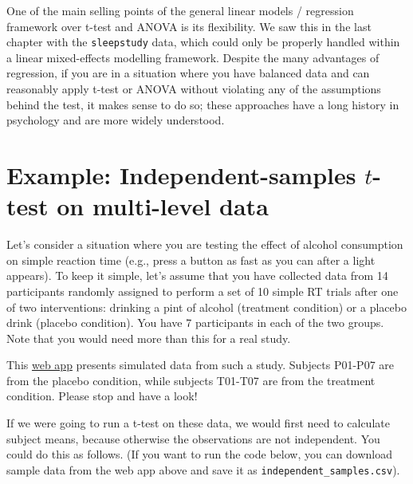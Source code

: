 \documentclass[]{book}
\newenvironment{Shaded}{\begin{snugshade}}{\end{snugshade}}
\newcommand{\DataTypeTok}[1]{\textcolor[rgb]{0.13,0.29,0.53}{#1}}
\newcommand{\KeywordTok}[1]{\textcolor[rgb]{0.13,0.29,0.53}{\textbf{#1}}}
\newcommand{\NormalTok}[1]{#1}
\newcommand{\OperatorTok}[1]{\textcolor[rgb]{0.81,0.36,0.00}{\textbf{#1}}}
\newcommand{\StringTok}[1]{\textcolor[rgb]{0.31,0.60,0.02}{#1}}
\begin{document}
One of the main selling points of the general linear models / regression framework over t-test and ANOVA is its flexibility. We saw this in the last chapter with the \texttt{sleepstudy} data, which could only be properly handled within a linear mixed-effects modelling framework. Despite the many advantages of regression, if you are in a situation where you have balanced data and can reasonably apply t-test or ANOVA without violating any of the assumptions behind the test, it makes sense to do so; these approaches have a long history in psychology and are more widely understood.

\hypertarget{example-independent-samples-t-test-on-multi-level-data}{%
\section{\texorpdfstring{Example: Independent-samples \(t\)-test on multi-level data}{Example: Independent-samples t-test on multi-level data}}\label{example-independent-samples-t-test-on-multi-level-data}}

Let's consider a situation where you are testing the effect of alcohol consumption on simple reaction time (e.g., press a button as fast as you can after a light appears). To keep it simple, let's assume that you have collected data from 14 participants randomly assigned to perform a set of 10 simple RT trials after one of two interventions: drinking a pint of alcohol (treatment condition) or a placebo drink (placebo condition). You have 7 participants in each of the two groups. Note that you would need more than this for a real study.

This \href{https://shiny.psy.gla.ac.uk/Dale/icc}{web app} presents simulated data from such a study. Subjects P01-P07 are from the placebo condition, while subjects T01-T07 are from the treatment condition. Please stop and have a look!

If we were going to run a t-test on these data, we would first need to calculate subject means, because otherwise the observations are not independent. You could do this as follows. (If you want to run the code below, you can download sample data from the web app above and save it as \texttt{independent\_samples.csv}).

\begin{Shaded}
\end{Shaded}
\end{document}
